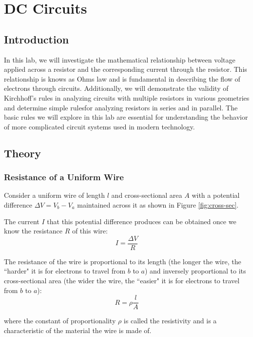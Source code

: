 \chapter{DC Circuits}

\section{Introduction}

In this lab, we will investigate the mathematical relationship between voltage applied across a resistor and the corresponding current through the resistor. This relationship is knows as Ohms law and is fundamental in describing the flow of electrons through circuits. Additionally, we will demonstrate the validity of Kirchhoff's rules in analyzing circuits with multiple resistors in various geometries and determine simple rulesfor analyzing resistors in series and in parallel. The basic rules we will explore in this lab are essential for understanding the behavior of more complicated circuit systems used in modern technology.

\section{Theory}
\subsection{Resistance of a Uniform Wire}

Consider a uniform wire of length $l$ and cross-sectional area $A$ with a potential difference $\Delta V = V_b - V_a$ maintained across it as shown in Figure \ref{fig:cross-sec}.\myskip


%
%

The current $I$ that this potential difference produces can be obtained once we know the resistance $R$ of this wire:
\begin{equation}
	I = \frac{\Delta V}{R}
\end{equation}

The resistance of the wire is proportional to its length (the longer the wire, the ``harder" it is for electrons to travel from $b$ to $a$) and inversely proportional to its cross-sectional area (the wider the wire, the ``easier" it is for electrons to travel from $b$ to $a$):
\begin{equation}
	R = \rho \frac{l}{A}
\end{equation}

where the constant of proportionality $\rho$ is called the resistivity and is a characteristic of the material the wire is made of.

